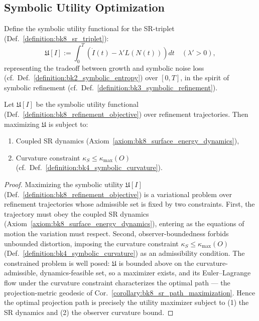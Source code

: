 \subsection{Symbolic Utility Optimization}
\label{subsec:bk8_symbolic_utility_optimization}
\begin{definition}
\label{definition:bk8_refinement_objective}
Define the symbolic utility functional for the SR-triplet (Def.~\ref{definition:bk8_sr_triplet}):
\[
\mathfrak{U}[I] := \int_0^T \left( \dot{I}(t) - \lambda' L(N(t)) \right) dt \quad (\lambda' > 0),
\]
representing the tradeoff between growth and symbolic noise loss (cf.~Def.~\ref{definition:bk2_symbolic_entropy}) over \( [0, T] \), in the spirit of symbolic refinement (cf.~Def.~\ref{definition:bk3_symbolic_refinement}).
\end{definition}
\begin{proposition}
\label{proposition:bk8_optimal_projection_path}
\leavevmode\newline
Let \( \mathfrak{U}[I] \) be the symbolic utility functional
(Def.~\ref{definition:bk8_refinement_objective}) over refinement trajectories.
Then maximizing \( \mathfrak{U} \) is subject to:
\begin{enumerate}
  \item Coupled SR dynamics (Axiom~\ref{axiom:bk8_surface_energy_dynamics}),
  \item Curvature constraint \( \kappa_S \leq \kappa_{\max}(O) \) (cf.~Def.~\ref{definition:bk4_symbolic_curvature}).
\end{enumerate}
\end{proposition}
\begin{proof}
\label{proof:bk8_optimal_projection_path}
\leavevmode
Maximizing the symbolic utility $\mathfrak{U}[I]$ (Def.~\ref{definition:bk8_refinement_objective}) is a variational problem over refinement trajectories whose admissible set is fixed by two constraints. First, the trajectory must obey the coupled SR dynamics (Axiom~\ref{axiom:bk8_surface_energy_dynamics}), entering as the equations of motion the variation must respect. Second, observer-boundedness forbids unbounded distortion, imposing the curvature constraint $\kappa_S\le\kappa_{\max}(O)$ (Def.~\ref{definition:bk4_symbolic_curvature}) as an admissibility condition. The constrained problem is well posed: $\mathfrak{U}$ is bounded above on the curvature-admissible, dynamics-feasible set, so a maximizer exists, and its Euler--Lagrange flow under the curvature constraint characterizes the optimal path --- the projection-metric geodesic of Cor.~\ref{corollary:bk8_sr_path_maximization}. Hence the optimal projection path is precisely the utility maximizer subject to (1) the SR dynamics and (2) the observer curvature bound.
\end{proof}
